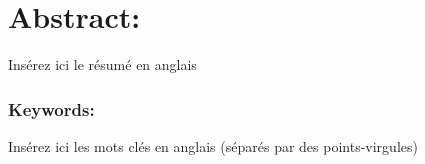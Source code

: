 \section*{Abstract:}
Insérez ici le résumé en anglais

\subsubsection*{Keywords:}
Insérez ici les mots clés en anglais (séparés par des points-virgules)
